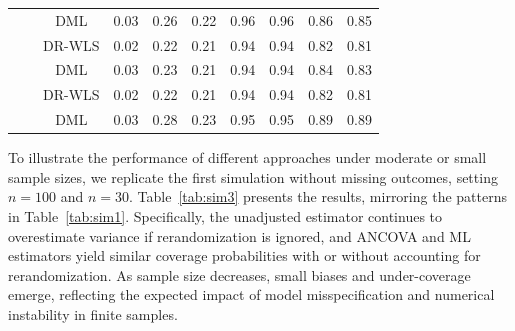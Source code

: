 \documentclass[12pt]{article}
\begin{document}
{\begin{table}[ht]
{\begin{tabular}{cccccccccc}
          & &  DML & 0.03 & 0.26 & 0.22 & 0.96 & 0.96 & 0.86 & 0.85 \\  
              \cmidrule(lr){2-10}
&  & DR-WLS & 0.02 & 0.22 & 0.21 & 0.94 & 0.94 & 0.82 & 0.81 \\  
          & &  DML & 0.03 & 0.23 & 0.21 & 0.94 & 0.94 & 0.84 & 0.83 \\  
              \cmidrule(lr){2-10}
&  & DR-WLS & 0.02 & 0.22 & 0.21 & 0.94 & 0.94 & 0.82 & 0.81 \\ 
          & &  DML &  0.03 & 0.28 & 0.23 & 0.95 & 0.95 & 0.89 & 0.89 \\  
\hline
    \end{tabular}
    }
\end{table}

{To illustrate the performance of different approaches under moderate or small sample sizes, we replicate the first simulation without missing outcomes, setting $n=100$ and $n=30$. Table~\ref{tab:sim3} presents the results, mirroring the patterns in Table~\ref{tab:sim1}. Specifically, the unadjusted estimator continues to overestimate variance if rerandomization is ignored, and ANCOVA and ML estimators yield similar coverage probabilities with or without accounting for rerandomization. As sample size decreases, small biases and under-coverage emerge, reflecting the expected impact of model misspecification and numerical instability in finite samples.}


}
\end{document}

